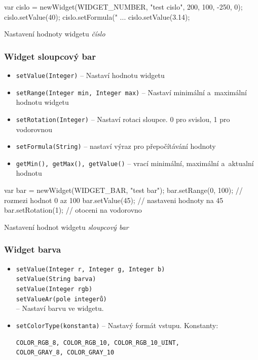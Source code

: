 \documentclass[12pt, a4paper, oneside]{article}
\newcommand{\It}{\textit}  %
\begin{document}
\begin{listing}[H]
\begin{jscode}
var cislo = newWidget(WIDGET_NUMBER,
                "test cislo", 200, 100, -250, 0);
cislo.setValue(40);
cislo.setFormula("%
...
cislo.setValue(3.14);
\end{jscode}
\caption{Nastavení hodnoty widgetu \It{číslo}}
\end{listing}

\subsubsection*{Widget sloupcový bar}
\begin{itemize}
    \item {\color{blue}\verb/setValue(Integer)/} -- Nastaví hodnotu widgetu
    \item {\color{blue}\verb/setRange(Integer min, Integer max)/} -- Nastaví minimální a~maximální hodnotu widgetu
    \item {\color{blue}\verb/setRotation(Integer)/} -- Nastaví rotaci sloupce. 0 pro svislou, 1 pro vodorovnou
    \item {\color{blue}\verb/setFormula(String)/} -- nastaví výraz pro přepočítávání hodnoty
    \item {\color{blue}\verb/getMin(), getMax(), getValue()/} -- vrací minimální, maximální a~aktualní hodnotu
\end{itemize}

\begin{listing}[H]
\begin{jscode}
var bar = newWidget(WIDGET_BAR, "test bar");
bar.setRange(0, 100); // rozmezi hodnot 0 az 100
bar.setValue(45); // nastaveni hodnoty na 45
bar.setRotation(1); // otoceni na vodorovno
\end{jscode}
\caption{Nastavení hodnot widgetu \It{sloupcový bar}}
\end{listing}

\subsubsection*{Widget barva}
\begin{itemize}
    \item {\color{blue}\verb/setValue(Integer r, Integer g, Integer b)/} \\
    {\color{blue}\verb/setValue(String barva)/} \\
    {\color{blue}\verb/setValue(Integer rgb)/} \\
    {\color{blue}\verb/setValueAr(pole integerů)/} \\
        -- Nastaví barvu ve widgetu.
    \item {\color{blue}\verb/setColorType(konstanta)/} -- Nastavý formát vstupu. Konstanty:
        \begin{verbatim}
COLOR_RGB_8, COLOR_RGB_10, COLOR_RGB_10_UINT,
COLOR_GRAY_8, COLOR_GRAY_10
        \end{verbatim}
\end{itemize}
\end{document}
